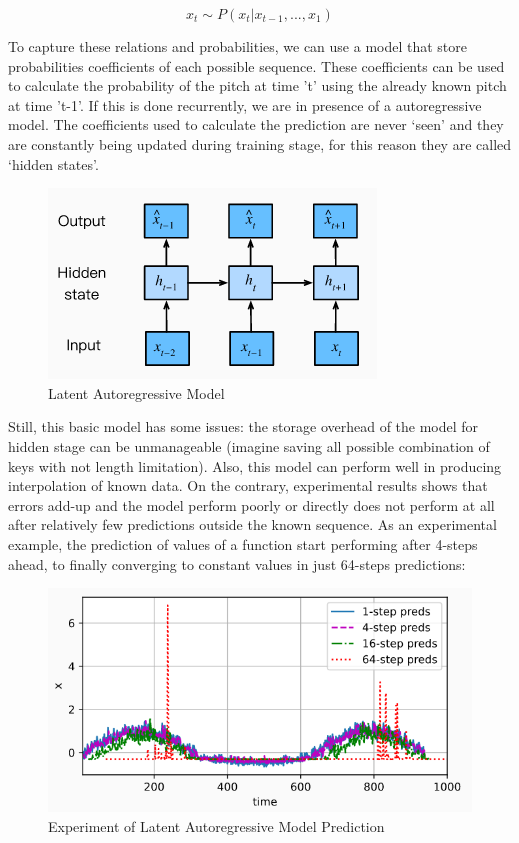 \begin{equation}
  x_t \sim P \left( x_t \vert  x_{t - 1}, ..., x_1 \right)
\end{equation}

To capture these relations and probabilities, we can use a model that store
probabilities coefficients of each possible sequence. These coefficients can be used to
calculate the probability of the pitch at time ’t’ using the already known pitch at time
’t-1’. If this is done recurrently, we are in presence of a autoregressive model. The
coefficients used to calculate the prediction are never ‘seen’ and they are constantly
being updated during training stage, for this reason they are called ‘hidden states’.

\begin{figure}[h!]
  \includegraphics[width=\linewidth]{image/fig_JDF12.png}
  \caption{Latent Autoregressive Model}
\end{figure}


Still, this basic model has some issues: the storage overhead of the model for hidden
stage can be unmanageable (imagine saving all possible combination of keys with not
length limitation). Also, this model can perform well in producing interpolation of known
data. On the contrary, experimental results shows that errors add-up and the model
perform poorly or directly does not perform at all after relatively few predictions outside
the known sequence. As an experimental example, the prediction of values of a
function start performing after 4-steps ahead, to finally converging to constant values
in just 64-steps predictions:

\begin{figure}[h!]
  \includegraphics[width=\linewidth]{image/fig_JDF13.png}
  \caption{Experiment of Latent Autoregressive Model Prediction}
\end{figure}


